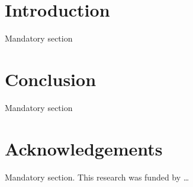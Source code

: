 \documentclass[11pt,a4paper]{fsc} %
\begin{document}
\begin{multicols}{2}
\section*{Introduction}
Mandatory section

\section*{Conclusion}
Mandatory section

\section*{Acknowledgements}
Mandatory section.
This research was funded by \ldots

\printbibliography

\end{multicols} %
\end{document}
